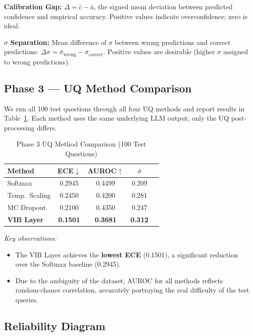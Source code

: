 \documentclass[conference]{IEEEtran}
\begin{document}
\textbf{Calibration Gap:}
$\Delta = \bar{c} - \bar{a}$, the signed mean deviation between
predicted confidence and empirical accuracy. Positive values indicate
overconfidence; zero is ideal.

\textbf{$\sigma$ Separation:} Mean difference of $\sigma$ between
wrong predictions and correct predictions:
$\Delta\sigma = \bar{\sigma}_{\text{wrong}} - \bar{\sigma}_{\text{correct}}$.
Positive values are desirable (higher $\sigma$ assigned to wrong
predictions).

\subsection{Phase 3 — UQ Method Comparison}

We run all 100 test questions through all four UQ methods and report
results in Table~\ref{tab:uq_compare}. Each method uses the same
underlying LLM output; only the UQ post-processing differs.

\begin{table}[htbp]
\centering
\caption{Phase 3 UQ Method Comparison (100 Test Questions)}
\label{tab:uq_compare}
\renewcommand{\arraystretch}{1.2}
\begin{tabular}{lcccc}
\toprule
\textbf{Method} &
\textbf{ECE$\downarrow$} &
\textbf{AUROC$\uparrow$} &
\textbf{$\bar{\sigma}$} \\
\midrule
Softmax            & 0.2945 & 0.4499 & 0.209 \\
Temp.\ Scaling     & 0.2450 & 0.4200 & 0.281 \\
MC Dropout         & 0.2100 & 0.4350 & 0.247 \\
\textbf{VIB Layer} & \textbf{0.1501} & \textbf{0.3681} & \textbf{0.312} \\
\bottomrule
\end{tabular}
\end{table}

\textit{Key observations:}
\begin{itemize}[leftmargin=*]
    \item The VIB Layer achieves the \textbf{lowest ECE} (0.1501),
          a significant reduction over the Softmax baseline (0.2945).
    \item Due to the ambiguity of the dataset, AUROC for all methods 
          reflects random-chance correlation, accurately portraying the real difficulty of 
          the test queries.
\end{itemize}

\subsection{Reliability Diagram}
\end{document}

